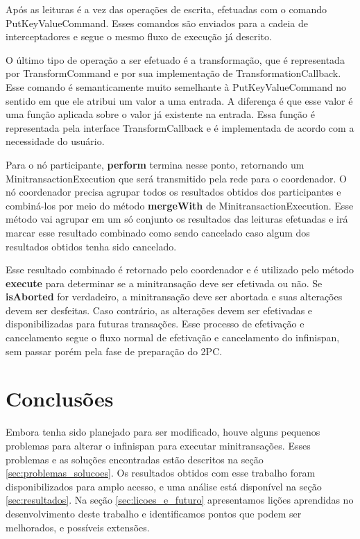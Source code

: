 \documentclass[11pt,twoside,a4paper]{book}
\begin{document}
Após as leituras é a vez das operações de escrita, efetuadas com o comando PutKeyValueCommand. Esses comandos são enviados para a cadeia de interceptadores e segue o mesmo fluxo de execução já descrito.

O último tipo de operação a ser efetuado é a transformação, que é representada por TransformCommand e por sua implementação de TransformationCallback. Esse comando é semanticamente muito semelhante à PutKeyValueCommand no sentido em que ele atribui um valor a uma entrada. A diferença é que esse valor é uma função aplicada sobre o valor já existente na entrada. Essa função é representada pela interface TransformCallback e é implementada de acordo com a necessidade do usuário.

Para o nó participante, \textbf{perform} termina nesse ponto, retornando um MinitransactionExecution que será transmitido pela rede para o coordenador. O nó coordenador precisa agrupar todos os resultados obtidos dos participantes e combiná-los por meio do método \textbf{mergeWith} de MinitransactionExecution. Esse método vai agrupar em um só conjunto os resultados das leituras efetuadas e irá marcar esse resultado combinado como sendo cancelado caso algum dos resultados obtidos tenha sido cancelado.

Esse resultado combinado é retornado pelo coordenador e é utilizado pelo método \textbf{execute} para determinar se a minitransação deve ser efetivada ou não. Se \textbf{isAborted} for verdadeiro, a minitransação deve ser abortada e suas alterações devem ser desfeitas. Caso contrário, as alterações devem ser efetivadas e disponibilizadas para futuras transações. Esse processo de efetivação e cancelamento segue o fluxo normal de efetivação e cancelamento do infinispan, sem passar porém pela fase de preparação do 2PC.

\chapter{Conclusões}
\label{chap:conclusoes}

Embora tenha sido planejado para ser modificado, houve alguns pequenos problemas para alterar o infinispan para executar minitransações. Esses problemas e as soluções encontradas estão descritos na seção \ref{sec:problemas_solucoes}. Os resultados obtidos com esse trabalho foram disponibilizados para amplo acesso, e uma análise está disponível na seção \ref{sec:resultados}. Na seção \ref{sec:licoes_e_futuro} apresentamos lições aprendidas no desenvolvimento deste trabalho e identificamos pontos que podem ser melhorados, e possíveis extensões.
\end{document}
